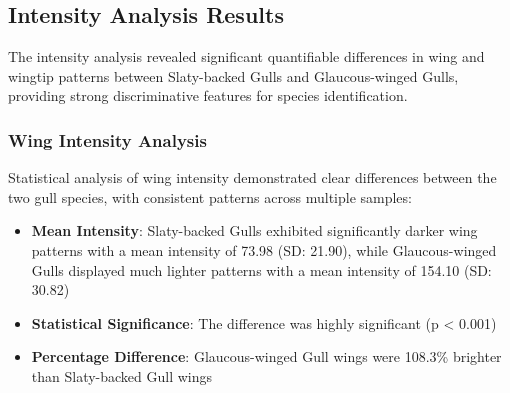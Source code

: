\documentclass[a4paper,12pt]{report}
\begin{document}
\subsection{Intensity Analysis Results}
The intensity analysis revealed significant quantifiable differences in wing and wingtip patterns between Slaty-backed Gulls and Glaucous-winged Gulls, providing strong discriminative features for species identification.

\subsubsection{Wing Intensity Analysis}
Statistical analysis of wing intensity demonstrated clear differences between the two gull species, with consistent patterns across multiple samples:

\begin{itemize}
    \item \textbf{Mean Intensity}: Slaty-backed Gulls exhibited significantly darker wing patterns with a mean intensity of 73.98 (SD: 21.90), while Glaucous-winged Gulls displayed much lighter patterns with a mean intensity of 154.10 (SD: 30.82)
    \item \textbf{Statistical Significance}: The difference was highly significant (p < 0.001)
    \item \textbf{Percentage Difference}: Glaucous-winged Gull wings were 108.3\% brighter than Slaty-backed Gull wings
\end{itemize}
\end{document}
